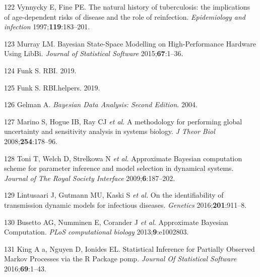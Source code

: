 \documentclass[11pt,twoside]{bristolthesis}
\begin{document}
  \leavevmode\hypertarget{ref-Vynnycky1997a}{}%
  122 Vynnycky E, Fine PE. The natural history of tuberculosis: the implications of age-dependent risks of disease and the role of reinfection. \emph{Epidemiology and infection} 1997;\textbf{119}:183--201.
  
  \leavevmode\hypertarget{ref-Murray2015}{}%
  123 Murray LM. Bayesian State-Space Modelling on High-Performance Hardware Using LibBi. \emph{Journal of Statistical Software} 2015;\textbf{67}:1--36.
  
  \leavevmode\hypertarget{ref-Funk:2019ud}{}%
  124 Funk S. RBI. 2019.
  
  \leavevmode\hypertarget{ref-Funk:2019uw}{}%
  125 Funk S. RBI.helpers. 2019.
  
  \leavevmode\hypertarget{ref-Gelman:nll_LBlw}{}%
  126 Gelman A. \emph{Bayesian Data Analysis: Second Edition}. 2004.
  
  \leavevmode\hypertarget{ref-Marino2009a}{}%
  127 Marino S, Hogue IB, Ray CJ \emph{et al.} A methodology for performing global uncertainty and sensitivity analysis in systems biology. \emph{J Theor Biol} 2008;\textbf{254}:178--96.
  
  \leavevmode\hypertarget{ref-Toni2009}{}%
  128 Toni T, Welch D, Strelkowa N \emph{et al.} Approximate Bayesian computation scheme for parameter inference and model selection in dynamical systems. \emph{Journal of The Royal Society Interface} 2009;\textbf{6}:187--202.
  
  \leavevmode\hypertarget{ref-Lintusaari2016}{}%
  129 Lintusaari J, Gutmann MU, Kaski S \emph{et al.} On the identifiability of transmission dynamic models for infectious diseases. \emph{Genetics} 2016;\textbf{201}:911--8.
  
  \leavevmode\hypertarget{ref-Busetto2013}{}%
  130 Busetto AG, Numminen E, Corander J \emph{et al.} Approximate Bayesian Computation. \emph{PLoS computational biology} 2013;\textbf{9}:e1002803.
  
  \leavevmode\hypertarget{ref-King2016}{}%
  131 King A a, Nguyen D, Ionides EL. Statistical Inference for Partially Observed Markov Processes via the R Package pomp. \emph{Journal Of Statistical Software} 2016;\textbf{69}:1--43.


\end{document}

